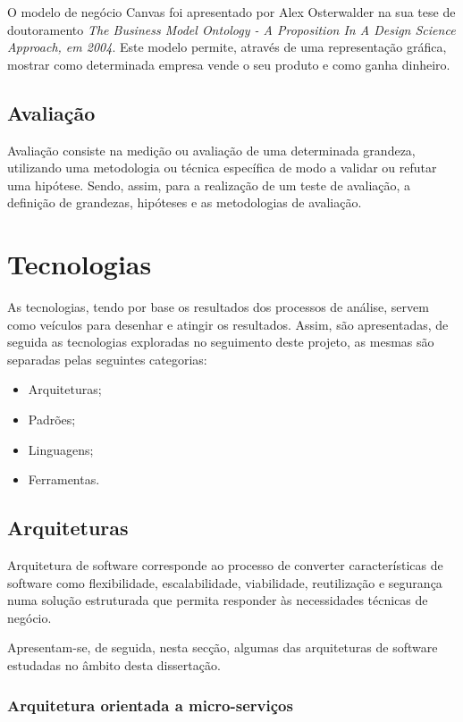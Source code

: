 O modelo de negócio Canvas foi apresentado por Alex Osterwalder na sua tese de doutoramento \emph{The Business Model Ontology - A Proposition In A Design Science Approach, em 2004}. Este modelo permite, através de uma representação gráfica, mostrar como determinada empresa vende o seu produto  e como ganha dinheiro\cite{canvas}.

\subsection{Avaliação \label{estado_arte_avaliacao}}
Avaliação consiste na medição ou avaliação de uma determinada grandeza, utilizando uma metodologia ou técnica específica de modo a validar ou refutar uma hipótese. Sendo, assim, para a realização de um teste de avaliação, a definição de grandezas, hipóteses e as metodologias de avaliação\cite{experimentation_principles}.

\section{Tecnologias}
As tecnologias, tendo por base os resultados dos processos de análise, servem como veículos para desenhar e atingir os resultados. Assim, são apresentadas, de seguida as tecnologias exploradas no seguimento deste projeto, as mesmas são separadas pelas seguintes categorias:
\begin{itemize}
    \item Arquiteturas;
    \item Padrões;
    \item Linguagens;
    \item Ferramentas.
\end{itemize}

\subsection{Arquiteturas}
Arquitetura de software corresponde ao processo de converter características de software como flexibilidade, escalabilidade, viabilidade, reutilização e segurança numa solução estruturada que permita responder às necessidades técnicas de negócio\cite{software_architecture}.

Apresentam-se, de seguida, nesta secção, algumas das arquiteturas de software estudadas no âmbito desta dissertação.

\subsubsection{Arquitetura orientada a micro-serviços}

